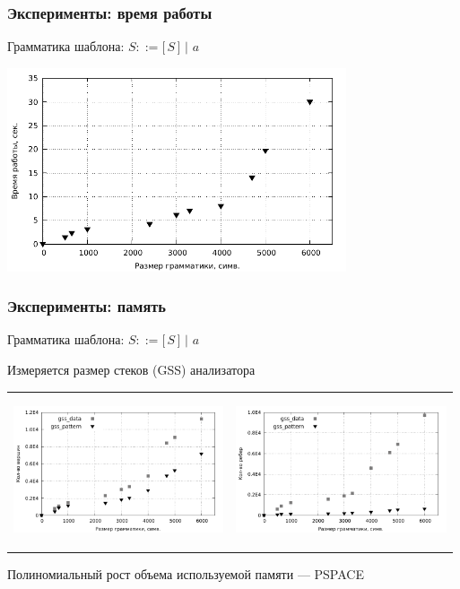 \documentclass{beamer}
\begin{document}
\begin{frame}
	\transwipe[direction=90]
	\frametitle{Эксперименты: время работы}
	Грамматика шаблона: $S ::= \texttt{[} \, S \, \texttt{]} \, \, | \, \, a$
	\begin{center}
		\includegraphics[width=10cm]{pictures/time.pdf}
	\end{center}
\end{frame}

\begin{frame}
	\transwipe[direction=90]
	\frametitle{Эксперименты: память}
	Грамматика шаблона: $S ::= \texttt{[} \, S \, \texttt{]} \, \, | \, \, a$
	
	Измеряется размер стеков (GSS) анализатора
	\vspace{-20pt}
	\begin{table}
		\centering
			\begin{tabular}{p{6cm} p{6cm}}
				\begin{center}
					\hspace{-20pt}
					{\includegraphics[width=6.2cm]{pictures/gss.pdf}}
				\end{center}
				&
			  \begin{center}
			  	\hspace{-25pt}
			  	{\includegraphics[width=6.2cm]{pictures/gss_edge.pdf}}
			  \end{center}
			\end{tabular}
	\end{table}
Полиномиальный рост объема используемой памяти --- PSPACE
\end{frame}
\end{document}
